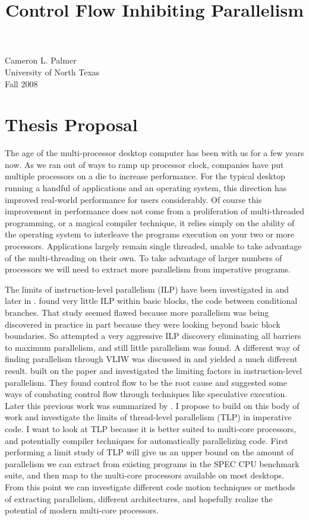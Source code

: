 \documentclass[12pt,twoside,letterpaper]{article}
\begin{document}
Cameron L. Palmer \\
University of North Texas \\
Fall 2008

\title{Control Flow Inhibiting Parallelism}

\section*{Thesis Proposal}
The age of the multi-processor desktop computer has been with us for a few years now. As we ran out of ways to ramp up processor clock, companies have put multiple processors on a die to increase performance. For the typical desktop running a handful of applications and an operating system, this direction has improved real-world performance for users considerably. Of course this improvement in performance does not come from a proliferation of multi-threaded programming, or a magical compiler technique, it relies simply on the ability of the operating system to interleave the programs execution on your two or more processors. Applications largely remain single threaded, unable to take advantage of the multi-threading on their own. To take advantage of larger numbers of processors we will need to extract more parallelism from imperative programs.

The limits of instruction-level parallelism (ILP) have been investigated in \cite{Tjaden:1970p214} and later in \cite{Wall:1991p191}. \cite{Tjaden:1970p214} found very little ILP within basic blocks, the code between conditional branches. That study seemed flawed because more parallelism was being discovered in practice in part because they were looking beyond basic block boundaries. So \cite{Wall:1991p191} attempted a very aggressive ILP discovery eliminating all barriers to maximum parallelism, and still little parallelism was found. A different way of finding parallelism through VLIW was discussed in \cite{Nicolau:1984p217} and yielded a much different result. \cite{Lam:1992p188} built on the \cite{Wall:1991p191} paper and investigated the limiting factors in instruction-level parallelism. They found control flow to be the root cause and suggested some ways of combating control flow through techniques like speculative execution. Later this previous work was summarized by \cite{Rau:1992p211}. I propose to build on this body of work and investigate the limits of thread-level parallelism (TLP) in imperative code. I want to look at TLP because it is better suited to multi-core processors, and potentially compiler techniques for automatically parallelizing code. First performing a limit study of TLP will give us an upper bound on the amount of parallelism we can extract from existing programs in the SPEC CPU benchmark suite, and then map to the multi-core processors available on most desktops. From this point we can investigate different code motion techniques or methods of extracting parallelism, different architectures, and hopefully realize the potential of modern multi-core processors.
\end{document}
